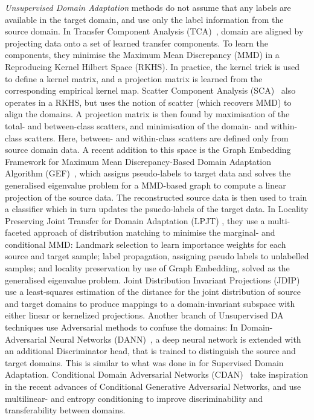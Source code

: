\documentclass[journal]{IEEEtran}
\begin{document}
\textit{Unsupervised Domain Adaptation} methods do not assume that any labels are available in the target domain, and use only the label information from the source domain. 
In Transfer Component Analysis (TCA)~\cite{pan2010tca}, domain are aligned by projecting data onto a set of learned transfer components. To learn the components, they minimise the Maximum Mean Discrepancy (MMD) in a Reproducing Kernel Hilbert Space (RKHS). In practice, the kernel trick is used to define a kernel matrix, and a projection matrix is learned from the corresponding empirical kernel map.
Scatter Component Analysis (SCA)~\cite{ghifary2017sca} also operates in a RKHS, but uses the notion of scatter (which recovers MMD) to align the domains. A projection matrix is then found by maximisation of the total- and between-class scatters, and minimisation of the domain- and within-class scatters. Here, between- and within-class scatters are defined only from source domain data.
A recent addition to this space is the Graph Embedding Framework for Maximum Mean Discrepancy-Based Domain Adaptation Algorithm (GEF)~\cite{chen2019gef}, which assigns pseudo-labels to target data and solves the generalised eigenvalue problem for a MMD-based graph to compute a linear projection of the source data. The reconstructed source data is then used to train a classifier which in turn updates the psuedo-labels of the target data. 
In Locality Preserving Joint Transfer for Domain Adaptation (LPJT) \cite{li2019locality}, they use a multi-faceted approach of distribution matching to minimise the marginal- and conditional MMD: Landmark selection to learn importance weights for each source and target sample; label propagation, assigning pseudo labels to unlabelled samples; and locality preservation by use of Graph Embedding, solved as the generalised eigenvalue problem.
Joint Distribution Invariant Projections (JDIP) \cite{chen2020domain} use a least-squares estimation of the  distance for the joint distribution of source and target domains to produce mappings to a domain-invariant subspace with either linear or kernelized projections.
Another branch of Unsupervised DA techniques use Adversarial methods to confuse the domains: In Domain-Adversarial Neural Networks (DANN)~\cite{ganin2016domain}, a deep neural network is extended with an additional Discriminator head, that is trained to distinguish the source and target domains. This is similar to what was done in \cite{tzeng2015simultaneous} for Supervised Domain Adaptation. 
Conditional Domain Adversarial Networks (CDAN)~\cite{long2018conditional} take inspiration in the recent advances of Conditional Generative Adversarial Networks, and use multilinear- and entropy conditioning to improve discriminability and transferability between domains.
\end{document}
